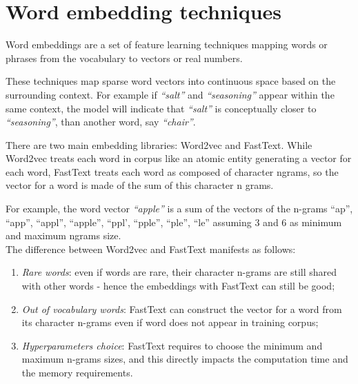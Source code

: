 \section{Word embedding techniques}
Word embeddings are a set of feature learning techniques mapping words or phrases from the vocabulary to vectors or real numbers. \par
These techniques map sparse word vectors into continuous space based on the surrounding context. For example if \textit{``salt''} and \textit{``seasoning''} appear within the same context, the model will indicate that \textit{``salt''} is conceptually closer to \textit{``seasoning''}, than another word, say \textit{``chair''}.\par
There are two main embedding libraries: Word2vec and FastText. While Word2vec treats each word in corpus like an atomic entity generating a vector for each word, FastText treats each word as composed of character ngrams, so the vector for a word is made of the sum of this character n grams. \par
For example,  the word vector \textit{``apple''} is a sum of the vectors of the n-grams ``ap'', ``app'', ``appl'', ``apple'', ``ppl', ``pple'', ``ple'', ``le'' assuming 3 and 6 as minimum and maximum ngrams size.\\
The difference between Word2vec and FastText manifests as follows:
\begin{enumerate}
\item \textit{Rare words}: even if words are rare, their character n-grams are still shared with other words - hence the embeddings with FastText can still be good;
\item \textit{Out of vocabulary words}: FastText can construct the vector for a word from its character n-grams even if word does not appear in training corpus;
\item \textit{Hyperparameters choice}: FastText requires to  choose the minimum and maximum n-grams sizes, and this directly impacts the computation time and the memory requirements. 
\end{enumerate}




